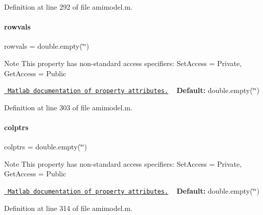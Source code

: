 Definition at line 292 of file amimodel.\+m.

\mbox{\label{classamimodel_aa0abea3560da3f409a28567f42d52872}} 
\paragraph{\texorpdfstring{rowvals}{rowvals}}
{\footnotesize\ttfamily rowvals = double.\+empty(\char`\"{}\char`\"{})}

\begin{DoxyNote}{Note}
This property has non-\/standard access specifiers\+: {\ttfamily Set\+Access = Private, Get\+Access = Public} 

\href{http://www.mathworks.com/help/matlab/matlab_oop/property-attributes.html}{\texttt{ Matlab documentation of property attributes.}} ~\newline
{\bfseries{Default\+:}} double.\+empty(\char`\"{}\char`\"{}) 
\end{DoxyNote}


Definition at line 303 of file amimodel.\+m.

\mbox{\label{classamimodel_a887e8a11654afa197d040d8bb10cbb38}} 
\paragraph{\texorpdfstring{colptrs}{colptrs}}
{\footnotesize\ttfamily colptrs = double.\+empty(\char`\"{}\char`\"{})}

\begin{DoxyNote}{Note}
This property has non-\/standard access specifiers\+: {\ttfamily Set\+Access = Private, Get\+Access = Public} 

\href{http://www.mathworks.com/help/matlab/matlab_oop/property-attributes.html}{\texttt{ Matlab documentation of property attributes.}} ~\newline
{\bfseries{Default\+:}} double.\+empty(\char`\"{}\char`\"{}) 
\end{DoxyNote}


Definition at line 314 of file amimodel.\+m.

\mbox{\label{classamimodel_adcfae93a688a66f1954d0832f51e4cc0}} 
